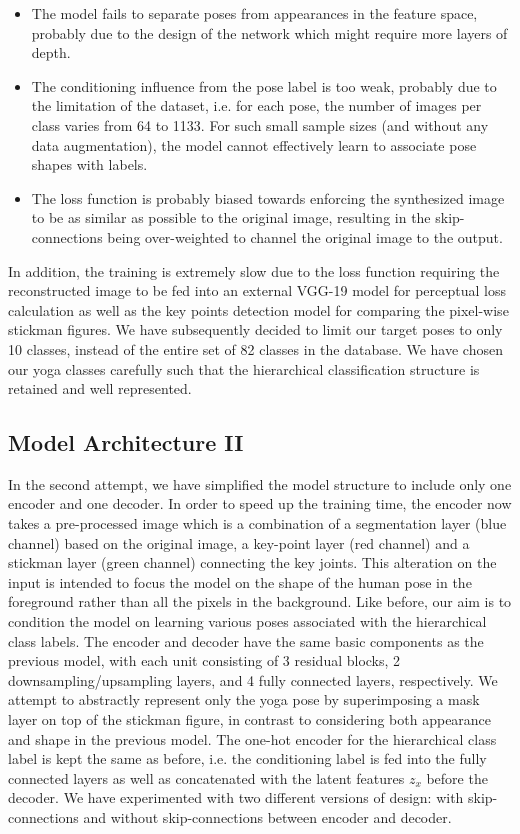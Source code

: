 \documentclass{article}
\begin{document}
\begin{itemize}
\item The model fails to separate poses from appearances in the feature space, probably due to the design of the network which might require more layers of depth.
\item The conditioning influence from the pose label is too weak, probably due to the limitation of the dataset, i.e. for each pose, the number of images per class varies from 64 to 1133. For such small sample sizes (and without any data augmentation), the model cannot effectively learn to associate pose shapes with labels.
\item The loss function is probably biased towards enforcing the synthesized image to be as similar as possible to the original image, resulting in the skip-connections being over-weighted to channel the original image to the output.
\end{itemize}

\noindent
In addition, the training is extremely slow due to the loss function requiring the reconstructed image to be fed into an external VGG-19 model for perceptual loss calculation as well as the key points detection model for comparing the pixel-wise stickman figures. We have subsequently decided to limit our target poses to only 10 classes, instead of the entire set of 82 classes in the database. We have chosen our yoga classes carefully such that the hierarchical classification structure is retained and well represented.  

\subsection{Model Architecture II}

In the second attempt, we have simplified the model structure to include only one encoder and one decoder. In order to speed up the training time, the encoder now takes a pre-processed image which is a combination of a segmentation layer (blue channel) based on the original image, a key-point layer (red channel) and a stickman layer (green channel) connecting the key joints. This alteration on the input is intended to focus the model on the shape of the human pose in the foreground rather than all the pixels in the background. Like before, our aim is to condition the model on learning various poses associated with the hierarchical class labels. 
\newline
\newline
\noindent
The encoder and decoder have the same basic components as the previous model, with each unit consisting of 3 residual blocks, 2 downsampling/upsampling layers, and 4 fully connected layers, respectively. We attempt to abstractly represent only the yoga pose by superimposing a mask layer on top of the stickman figure, in contrast to considering both appearance and shape in the previous model. The one-hot encoder for the hierarchical class label is kept the same as before, i.e. the conditioning label is fed into the fully connected layers as well as concatenated with the latent features $z_x$ before the decoder. We have experimented with two different versions of design: with skip-connections and without skip-connections between encoder and decoder.
\end{document}
